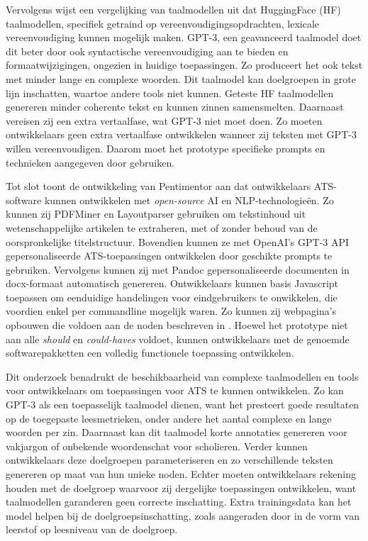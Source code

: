 \medspace

Vervolgens wijst een vergelijking van taalmodellen uit dat HuggingFace (HF) taalmodellen, specifiek getraind op vereenvoudigingsopdrachten, lexicale vereenvoudiging kunnen mogelijk maken. GPT-3, een geavanceerd taalmodel doet dit beter door ook syntactische vereenvoudiging aan te bieden en formaatwijzigingen, ongezien in huidige toepassingen. Zo produceert het ook tekst met minder lange en complexe woorden. Dit taalmodel kan doelgroepen in grote lijn inschatten, waartoe andere tools niet kunnen. Geteste HF taalmodellen genereren minder coherente tekst en kunnen zinnen samensmelten. Daarnaast vereisen zij een extra vertaalfase, wat GPT-3 niet moet doen. Zo moeten ontwikkelaars geen extra vertaalfase ontwikkelen wanneer zij teksten met GPT-3 willen vereenvoudigen. Daarom moet het prototype specifieke prompts en technieken aangegeven door \textcite{McFarland2023, White2023} gebruiken.

\medspace

Tot slot toont de ontwikkeling van Pentimentor aan dat ontwikkelaars ATS-software kunnen ontwikkelen met \textit{open-source} AI en NLP-technologieën. Zo kunnen zij PDFMiner en Layoutparser gebruiken om tekstinhoud uit wetenschappelijke artikelen te extraheren, met of zonder behoud van de oorspronkelijke titelstructuur. Bovendien kunnen ze met OpenAI's GPT-3 API gepersonaliseerde ATS-toepassingen ontwikkelen door geschikte prompts te gebruiken. Vervolgens kunnen zij met Pandoc gepersonaliseerde documenten in docx-formaat automatisch genereren. Ontwikkelaars kunnen basis Javascript toepassen om eenduidige handelingen voor eindgebruikers te onwikkelen, die voordien enkel per commandline mogelijk waren. Zo kunnen zij webpagina's opbouwen die voldoen aan de noden beschreven in \textcite{Rello2012a}.  Hoewel het prototype niet aan alle \textit{should} en \textit{could-haves} voldoet, kunnen ontwikkelaars met de genoemde softwarepakketten een volledig functionele toepassing ontwikkelen.

\medspace

Dit onderzoek benadrukt de beschikbaarheid van complexe taalmodellen en tools voor ontwikkelaars om toepassingen voor ATS te kunnen ontwikkelen. Zo kan GPT-3 als een toepasselijk taalmodel dienen, want het presteert goede resultaten op de toegepaste leesmetrieken, onder andere het aantal complexe en lange woorden per zin. Daarnaast kan dit taalmodel korte annotaties genereren voor vakjargon of onbekende woordenschat voor scholieren. Verder kunnen ontwikkelaars deze doelgroepen parameteriseren en zo verschillende teksten genereren op maat van hun unieke noden. Echter moeten ontwikkelaars rekening houden met de doelgroep waarvoor zij dergelijke toepassingen ontwikkelen, want taalmodellen garanderen geen correcte inschatting. Extra trainingsdata kan het model helpen bij de doelgroepsinschatting, zoals aangeraden door \textcite{Gooding2022} in de vorm van leerstof op leesniveau van de doelgroep.